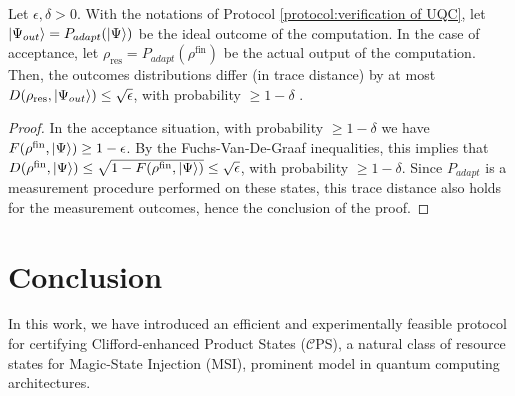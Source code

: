 \documentclass[a4paper,twocolumn,11pt,unpublished]{quantumarticle}
\newcommand{\CEPS}{$\mathcal C$PS}
\begin{document}
\begin{theorem}
    Let $\epsilon, \delta >0$. With the notations of Protocol \ref{protocol:verification of UQC}, 
    let $\ket{\Psi_{out}} = P_{adapt}(\ket\Psi)$ be the ideal outcome of the computation. In the case of acceptance, let $\rho_{\mathrm{res}} = P_{adapt}(\rho^{\mathrm{fin}})$ be the actual output of the computation. Then,
    the outcomes distributions differ (in trace distance) by at most
        $D(\rho_{\mathrm{res}}, \ket{\Psi_{out}}) \leq \sqrt\epsilon$, with probability $\geq 1-\delta$
        .
\end{theorem}


\begin{proof}
    In the acceptance situation, with probability $\geq 1-\delta$ we have $F(\rho^{\mathrm{fin}}, \ket\Psi) \geq 1-\epsilon$. By the Fuchs-Van-De-Graaf inequalities, this implies that $D(\rho^{\mathrm{fin}}, \ket\Psi) \leq \sqrt{1-F(\rho^{\mathrm{fin}}, \ket\Psi)} \leq \sqrt{\epsilon}$, with probability $\geq 1-\delta$. Since $P_{adapt}$ is a measurement procedure performed on these states, this trace distance also holds for the measurement outcomes, hence the conclusion of the proof.
\end{proof}







\section{Conclusion}
\label{section:conclusion}

In this work, we have introduced an efficient and experimentally feasible protocol for certifying Clifford-enhanced Product States (\CEPS), a natural class of resource states for Magic-State Injection (MSI), prominent model in
quantum computing architectures.
\end{document}
